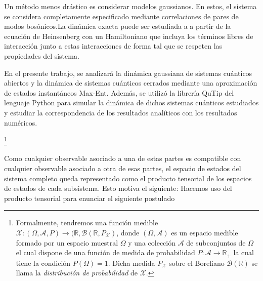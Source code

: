 \begin{Omitir}
Un método menos drástico es considerar modelos gaussianos. En estos, el sistema se considera completamente especificado mediante correlaciones de pares de modos bosónicos.La dinámica exacta puede ser estudiada a a partir de la ecuación de Heinsenberg con un Hamiltoniano que incluya los términos libres de interacción junto a estas interacciones de forma tal que se respeten las propiedades del sistema.
\end{Omitir}

\begin{Omitir}
En el presente trabajo, se analizará la dinámica gaussiana  de sistemas cuánticos abiertos y la dinámica de sistemas cuánticos cerrados mediante una aproximación de estados instantáneos Max-Ent. Además, se utilizó la librería QuTip del lenguaje Python para simular la dinámica de dichos sistemas cuánticos estudiados y estudiar la correspondencia de los resultados analíticos con los resultados numéricos. 
\end{Omitir}

\begin{Omitir}

\footnote{Formalmente, tendremos una función medible \cite{Portesi-ECI34} $\mathcal{X}: (\Omega, \mathcal{A}, P) \rightarrow (\mathds{R},\mathcal{B}(\mathds{R}, P_\mathcal{X})$, donde $(\Omega,\mathcal{A})$ es un espacio medible formado por un espacio muestral $\Omega$ y una colección $\mathcal{A}$ de subconjuntos de $\Omega$ el cual dispone de una función de medida de probabilidad $P : \mathcal{A} \rightarrow \mathbb{R}_{+}$ la cual tiene la condición $P(\Omega) = 1$. Dicha medida $P_\mathcal{X}$ sobre el Boreliano $\mathcal{B}(\mathbb{R})$ se llama la \textit{distribución de probabilidad} de $\mathcal{X}$. }

\end{Omitir}

\begin{Omitir}
{\color{red}Como cualquier observable asociado a una de estas partes es compatible con cualquier observable asociado a otra de esas partes, el espacio de estados del sistema completo queda representado como el producto tensorial de los espacios de estados de cada subsistema. Esto motiva el siguiente:}{\color{blue}  Hacemos uso del producto tensorial para enunciar el siguiente postulado}
\end{Omitir}

